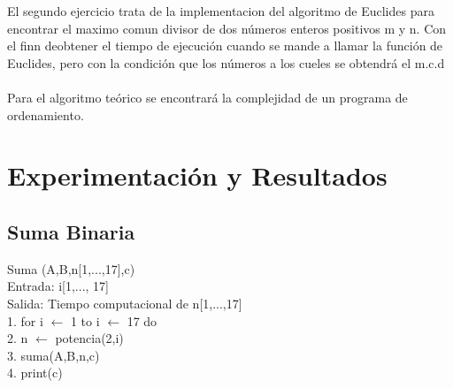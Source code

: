 \documentclass[spanish]{article}
\begin{document}
El segundo ejercicio trata de la implementacion del algoritmo de Euclides para encontrar el maximo comun divisor de dos números enteros positivos m y n. 
Con el finn deobtener el tiempo de ejecución cuando se mande a llamar la función de Euclides, 
pero con la condición que los números a los cueles se obtendrá el m.c.d 
\\\\
Para el algoritmo teórico se encontrará la complejidad de un programa de ordenamiento.
	
	\newpage
\section{Experimentaci\'on y Resultados}
	\subsection{Suma Binaria}
	Suma (A,B,n[1,...,17],c)\\
Entrada: i[1,..., 17]\\
Salida: Tiempo computacional de n[1,...,17]\\
1. for i $\leftarrow$ 1 to i $\leftarrow$ 17 do\\
2.		\hspace{0.7cm}n $\leftarrow$ potencia(2,i)\\
3.      \hspace{0.7cm}suma(A,B,n,c)\\
4. 		\hspace{0.7cm}print(c)
\bigskip
\end{document}
